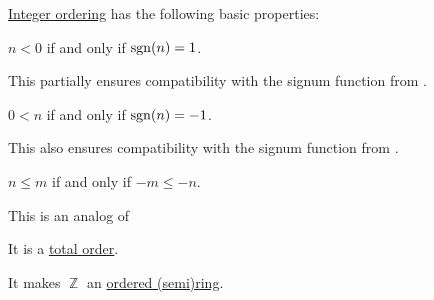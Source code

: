 \begin{proposition}\label{thm:def:integer_ordering}
  \hyperref[def:integer_ordering]{Integer ordering} has the following basic properties:
  \begin{thmenum}
     \( n < 0 \) if and only if \( \operatorname{sgn}(n) = 1 \).

    This partially ensures compatibility with the signum function from .

     \( 0 < n \) if and only if \( \operatorname{sgn}(n) = -1 \).

    This also ensures compatibility with the signum function from .

     \( n \leq m \) if and only if \( -m \leq -n \).

    This is an analog of 

     It is a \hyperref[def:totally_ordered_set]{total order}.

     It makes \( \BbbZ \) an \hyperref[def:ordered_semiring]{ordered (semi)ring}.
  \end{thmenum}
\end{proposition}
